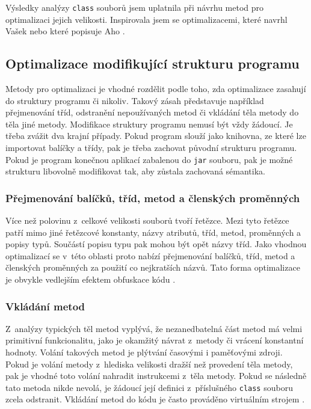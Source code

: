 Výsledky analýzy \texttt{class} souborů jsem uplatnila při návrhu metod pro optimalizaci jejich velikosti. Inspirovala jsem se optimalizacemi, které navrhl Vašek \cite{Vasek:Optimalizace} nebo které popisuje Aho \cite{Aho:Compilers}. 

\subsection{Optimalizace modifikující strukturu programu}

Metody pro optimalizaci je vhodné rozdělit podle toho, zda optimalizace zasahují do struktury programu či nikoliv. Takový zásah představuje například přejmenování tříd, odstranění nepoužívaných metod či vkládání těla metody do těla jiné metody.
Modifikace struktury programu nemusí být vždy žádoucí. Je třeba zvážit dva krajní případy. Pokud program slouží jako knihovna, ze které lze importovat balíčky a třídy, pak je třeba zachovat původní strukturu programu. Pokud je program konečnou aplikací zabalenou do \texttt{jar} souboru, pak je možné strukturu libovolně modifikovat tak, aby zůstala zachovaná sémantika.

\subsubsection{Přejmenování balíčků, tříd, metod a členských proměnných}
Více než polovinu z~celkové velikosti souborů tvoří řetězce. Mezi tyto řetězce patří mimo jiné řetězcové konstanty, názvy atributů, tříd, metod, proměnných a popisy typů. Součástí popisu typu pak mohou být opět názvy tříd. Jako vhodnou optimalizací se v~této oblasti proto nabízí přejmenování balíčků, tříd, metod a členských proměnných za použití co nejkratších názvů. Tato forma optimalizace je obvykle vedlejším efektem obfuskace kódu \cite{Chan:Obfuscation}.

\subsubsection{Vkládání metod}
Z~analýzy typických těl metod vyplývá, že nezanedbatelná část metod má velmi primitivní funkcionalitu, jako je okamžitý návrat z~metody či vrácení konstantní hodnoty. Volání takových metod je plýtvání časovými i paměťovými zdroji. Pokud je volání metody z~hlediska velikosti dražší než provedení těla metody, pak je vhodné toto volání nahradit instrukcemi z~těla metody. Pokud se následně tato metoda nikde nevolá, je žádoucí její definici z~příslušného \texttt{class} souboru zcela odstranit. Vkládání metod do kódu je často prováděno virtuálním strojem \cite{Oracle:JVM}.

